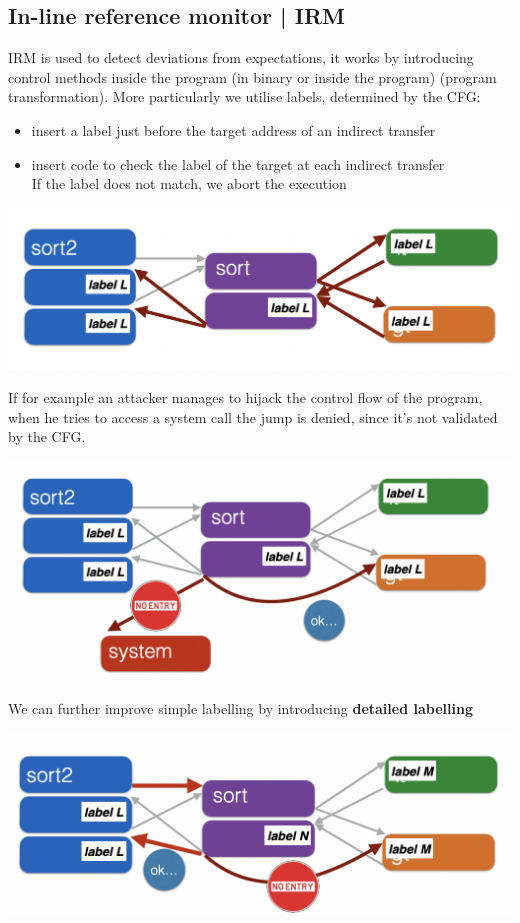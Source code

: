 \documentclass[11pt, oneside]{article}   	%
\begin{document}
\subsection*{In-line reference monitor | IRM} 
IRM is used to detect deviations from expectations, it works by introducing control methods inside the program (in binary or inside the program) (program transformation). More particularly we utilise labels, determined by the CFG:\begin{itemize}
\item insert a label just before the target address of an indirect transfer
\item insert code to check the label of the target at each indirect transfer\\
If the label does not match, we abort the execution
\end{itemize}
\begin{center}
\includegraphics[scale = 0.4]{labels}
\end{center}
If for example an attacker manages to hijack the control flow of the program, when he tries to access a system call the jump is denied, since it's not validated by the CFG.
\begin{center}
\includegraphics[scale = 0.4]{labels2}
\end{center}
We can further improve simple labelling by introducing \textbf{detailed labelling}
\begin{center}
\includegraphics[scale = 0.4]{labels3}
\end{center}
\end{document}

